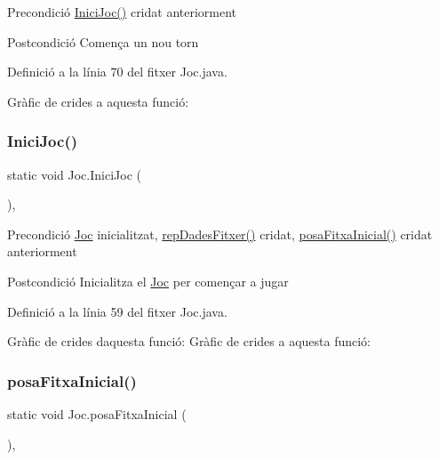 \begin{DoxyPrecond}{Precondició}
\mbox{\hyperlink{class_joc_ac38319889956e19c22ffd289ebd39824}{Inici\+Joc()}} cridat anteriorment 
\end{DoxyPrecond}
\begin{DoxyPostcond}{Postcondició}
Comença un nou torn 
\end{DoxyPostcond}


Definició a la línia 70 del fitxer Joc.\+java.

Gràfic de crides a aquesta funció\+:
\mbox{\label{class_joc_ac38319889956e19c22ffd289ebd39824}} 
\subsubsection{\texorpdfstring{Inici\+Joc()}{IniciJoc()}}
{\footnotesize\ttfamily static void Joc.\+Inici\+Joc (\begin{DoxyParamCaption}{ }\end{DoxyParamCaption})\hspace{0.3cm}{\ttfamily [static]}, {\ttfamily [private]}}

\begin{DoxyPrecond}{Precondició}
\mbox{\hyperlink{class_joc}{Joc}} inicialitzat, \mbox{\hyperlink{class_joc_afc0eb31677985cd98be8ed2debc31efa}{rep\+Dades\+Fitxer()}} cridat, \mbox{\hyperlink{class_joc_ab6a95f4790ad123e0fa5700cc984973e}{posa\+Fitxa\+Inicial()}} cridat anteriorment 
\end{DoxyPrecond}
\begin{DoxyPostcond}{Postcondició}
Inicialitza el \mbox{\hyperlink{class_joc}{Joc}} per començar a jugar 
\end{DoxyPostcond}


Definició a la línia 59 del fitxer Joc.\+java.

Gràfic de crides d\textquotesingle{}aquesta funció\+:
Gràfic de crides a aquesta funció\+:
\mbox{\label{class_joc_ab6a95f4790ad123e0fa5700cc984973e}} 
\subsubsection{\texorpdfstring{posa\+Fitxa\+Inicial()}{posaFitxaInicial()}}
{\footnotesize\ttfamily static void Joc.\+posa\+Fitxa\+Inicial (\begin{DoxyParamCaption}{ }\end{DoxyParamCaption})\hspace{0.3cm}{\ttfamily [static]}, {\ttfamily [private]}}

